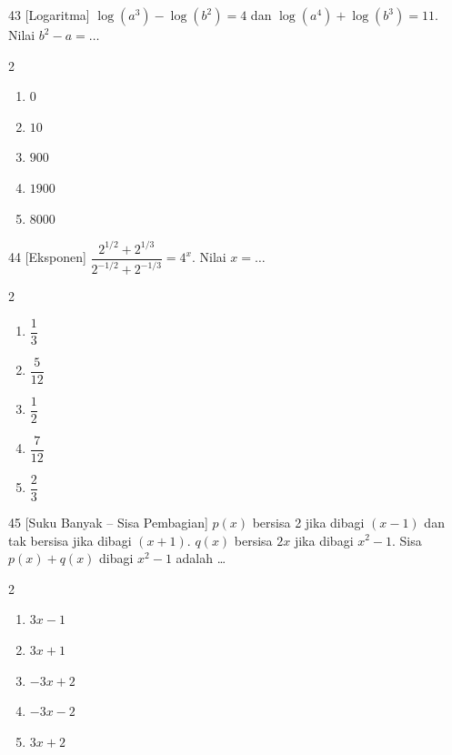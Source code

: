 \documentclass[11pt]{article}
\newenvironment{pilB}{%
  \par\smallskip\begin{multicols}{2}
  \begin{enumerate}[label=(\alph*),leftmargin=*,itemsep=1pt,topsep=3pt]}%
  {\end{enumerate}\end{multicols}}
\begin{document}
\begin{soal}{43 \normalfont\small[Logaritma]}
$\log(a^3)-\log(b^2)=4$ dan $\log(a^4)+\log(b^3)=11$. Nilai $b^2-a=\ldots$
\begin{pilB}
  \item $0$ \item $10$ \item $900$ \item $1900$ \item $8000$
\end{pilB}
\end{soal}

\begin{soal}{44 \normalfont\small[Eksponen]}
$\dfrac{2^{1/2}+2^{1/3}}{2^{-1/2}+2^{-1/3}}=4^x$. Nilai $x=\ldots$
\begin{pilB}
  \item $\dfrac13$ \item $\dfrac{5}{12}$ \item $\dfrac12$ \item $\dfrac{7}{12}$ \item $\dfrac23$
\end{pilB}
\end{soal}

\begin{soal}{45 \normalfont\small[Suku Banyak -- Sisa Pembagian]}
$p(x)$ bersisa 2 jika dibagi $(x-1)$ dan tak bersisa jika dibagi $(x+1)$.
$q(x)$ bersisa $2x$ jika dibagi $x^2-1$.
Sisa $p(x)+q(x)$ dibagi $x^2-1$ adalah \ldots
\begin{pilB}
  \item $3x-1$ \item $3x+1$ \item $-3x+2$ \item $-3x-2$ \item $3x+2$
\end{pilB}
\end{soal}
\end{document}

